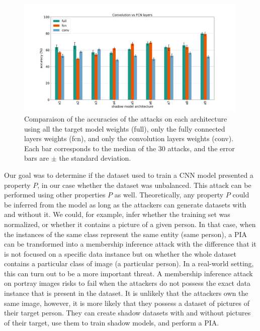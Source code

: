 \documentclass[11pt]{article}
\begin{document}
\begin{figure}[h!]
    \centering
    \begin{minipage}{\textwidth}
        \centering
        \includegraphics[width=0.99\textwidth]{accuracy_conv_fcn.png} %
        \caption{Comparaison of the accuracies of the attacks on each architecture using all the target model weights (full), only the fully connected layers weights (fcn), and only the convolution layers weights (conv). Each bar corresponds to the median of the 30 attacks, and the error bars are $\pm$ the standard deviation.}
        \label{accuracy_conv_fcn}
    \end{minipage}\hfill
\end{figure}


Our goal was to determine if the dataset used to train a CNN model presented a property $P$, in our case whether the dataset was unbalanced. This attack can be performed using other properties $P$ as well. Theoretically, any property $P$ could be inferred from the model as long as the attackers can generate datasets with and without it. We could, for example, infer whether the training set was normalized, or whether it contains a picture of a given person. In that case, when the instances of the same class represent the same entity (same person), a PIA can be transformed into a membership inference attack with the difference that it is not focused on a specific data instance but on whether the whole dataset contains a particular class of image (a particular person). In a real-world setting, this can turn out to be a more important threat. A membership inference attack on portray images risks to fail when the attackers do not possess the exact data instance that is present in the dataset. It is unlikely that the attackers own the same image, however, it is more likely that they possess a dataset of pictures of their target person. They can create shadow datasets with and without pictures of their target, use them to train shadow models, and perform a PIA.\\
\end{document}
